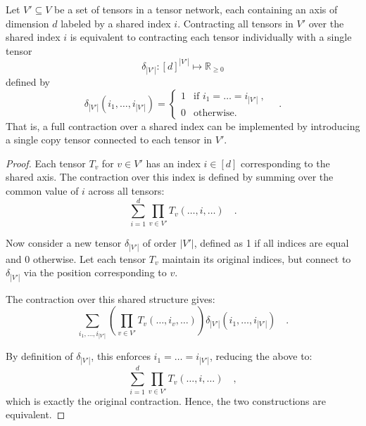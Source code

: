 \documentclass[../../main.tex]{subfiles}
\begin{document}
    \begin{proposition}
        \label{proposition:contracting_over_shared_index}
        Let $V' \subseteq V$ be a set of tensors in a tensor network, each containing an axis of dimension $d$ labeled by a shared index $i$. Contracting all tensors in $V'$ over the shared index $i$ is equivalent to contracting each tensor individually with a single tensor 
        \[
        \delta_{|V'|} : [d]^{|V'|} \mapsto \mathbb{R}_{\geq 0}
        \]
        defined by
        \[
        \delta_{|V'|}(i_1, \dots, i_{|V'|}) = 
        \begin{cases}
        1 & \text{if } i_1 = \dots = i_{|V'|} \ , \\
        0 & \text{otherwise.}
        \end{cases}
        \quad .
        \]
        That is, a full contraction over a shared index can be implemented by introducing a single copy tensor connected to each tensor in $V'$.
    \end{proposition}

\begin{proof}
Each tensor $T_v$ for $v \in V'$ has an index \( i \in [d] \) corresponding to the shared axis. The contraction over this index is defined by summing over the common value of \( i \) across all tensors:
\[
\sum_{i=1}^d \prod_{v \in V'} T_v(\dots, i, \dots) \quad .
\]

Now consider a new tensor \( \delta_{|V'|} \) of order \( |V'| \), defined as 1 if all indices are equal and 0 otherwise. Let each tensor \( T_v \) maintain its original indices, but connect to \( \delta_{|V'|} \) via the position corresponding to \( v \).

The contraction over this shared structure gives:
\[
\sum_{i_1, \dots, i_{|V'|}} \left( \prod_{v \in V'} T_v(\dots, i_v, \dots) \right) \delta_{|V'|}(i_1, \dots, i_{|V'|}) \quad .
\]

By definition of \( \delta_{|V'|} \), this enforces \( i_1 = \dots = i_{|V'|} \), reducing the above to:
\[
\sum_{i=1}^d \prod_{v \in V'} T_v(\dots, i, \dots) \quad ,
\]
which is exactly the original contraction. Hence, the two constructions are equivalent.
\end{proof}
\end{document}
